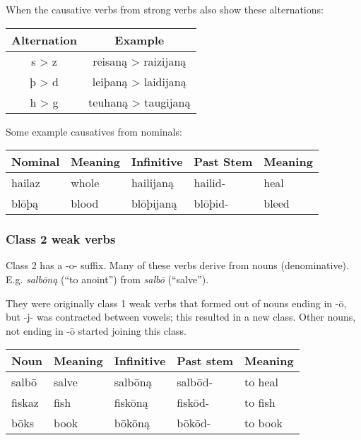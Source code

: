 \documentclass{article}
\begin{document}
When the causative verbs from strong verbs also show these alternations:

\begin{center}
\begin{tabular}{|cc|}
\hline
Alternation & Example \\
\hline
s > z & reisaną > raizijaną \\
þ > d & leiþaną > laidijaną \\
h > g & teuhaną > taugijaną \\
\hline
\end{tabular}
\end{center}

Some example causatives from nominals:

\begin{center}
\begin{tabular}{| l l l l l |}
\hline
Nominal & Meaning & Infinitive & Past Stem & Meaning \\
\hline
hailaz & whole & hailijaną & hailid- & heal \\
blōþą  & blood & blōþijaną & blōþid- & bleed \\
\hline
\end{tabular}
\end{center}

\subsubsection{Class 2 weak verbs}

Class 2 has a -o- suffix. Many of these verbs derive from nouns (denominative). E.g. \textit{ salbōną} (``to anoint'') from \textit{salbō} (``salve'').

They were originally class 1 weak verbs that formed out of nouns ending in -ō, but -j- was contracted between vowels; this resulted in a new class. Other nouns, not ending in -ō started joining this class.

\begin{center}
\begin{tabular}{| l l l l l |}
\hline
Noun & Meaning & Infinitive & Past stem & Meaning \\
\hline
salbō  & salve & salbōną & salbōd- & to heal \\
\hline
fiskaz & fish  & fiskōną & fiskōd- & to fish \\
bōks   & book  & bōkōną  & bōkōd-  & to book \\
\hline
\end{tabular}
\end{center}
\end{document}
